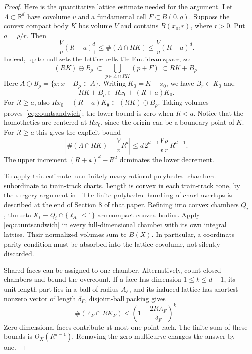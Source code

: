 \documentclass[11pt,a4paper]{article}
\numberwithin{equation}{section}
\theoremstyle{definition}
\theoremstyle{remark}
\newcommand{\RR}{\mathbb R}
\begin{document}
\begin{proof}
Here is the quantitative lattice estimate needed for the argument.
Let $\Lambda\subset\RR^d$ have covolume $v$ and a fundamental cell
$F\subset B(0,\rho)$.  Suppose the convex compact body $K$ has volume
$V$ and contains $B(x_0,r)$, where $r>0$.  Put $a=\rho/r$.  Then
\begin{equation}
 \frac Vv(R-a)_+^d
 \leq\#(\Lambda\cap RK)
 \leq\frac Vv(R+a)^d.
 \label{eq:countsandwich}
\end{equation}
Indeed, up to null sets the lattice cells tile Euclidean space, so
\[
 (RK)\ominus B_\rho
 \ \subset\!
 \bigcup_{p\in\Lambda\cap RK}(p+F)
 \ \subset RK+B_\rho.
\]
Here $A\ominus B_\rho=\{x:x+B_\rho\subset A\}$.
Writing $K_0=K-x_0$, we have $B_r\subset K_0$ and
\[
 RK+B_\rho\subset Rx_0+(R+a)K_0.
\]
For $R\geq a$, also
$Rx_0+(R-a)K_0\subset(RK)\ominus B_\rho$.
Taking volumes proves~\eqref{eq:countsandwich}; the lower bound is
zero when $R<a$.  Notice that the homotheties are centered at
$Rx_0$, since the origin can be a boundary point of $K$.
For $R\geq a$ this gives the explicit bound
\begin{equation}
 \left|\#(\Lambda\cap RK)-\frac VvR^d\right|
 \leq d\,2^{d-1}\frac Vv\frac\rho r\,R^{d-1}.
 \label{eq:countcellerror}
\end{equation}
The upper increment $(R+a)^d-R^d$ dominates the lower decrement.

To apply this estimate, use finitely many rational polyhedral
chambers subordinate to train-track charts.  Length is convex in
each train-track cone, by the surgery argument in
\cite[Theorem 5.1]{EMMEffective}.  The finite polyhedral handling of
chart overlaps is described at the end of Section 8 of that paper.
Refining into convex chambers $Q_i$, the sets
$K_i=Q_i\cap\{\ell_X\leq1\}$ are compact convex bodies.  Apply
\eqref{eq:countsandwich} in every full-dimensional chamber with its
own integral lattice.  Their normalized volumes sum to $B(X)$.
In particular, a coordinate parity condition must be absorbed into
the lattice covolume, not silently discarded.

Shared faces can be assigned to one chamber.  Alternatively, count
closed chambers and bound the overcount.  If a face has dimension
$1\leq k\leq d-1$, its unit-length part lies in a ball of radius $A_F$, and
its induced lattice has shortest nonzero vector of length $\delta_F$,
disjoint-ball packing gives
\[
 \#(\Lambda_F\cap RK_F)
 \leq\left(1+\frac{2RA_F}{\delta_F}\right)^k.
\]
Zero-dimensional faces contribute at most one point each.  The
finite sum of these bounds is $O_X(R^{d-1})$.
Removing the zero multicurve changes the answer by one.
\end{proof}
\end{document}
